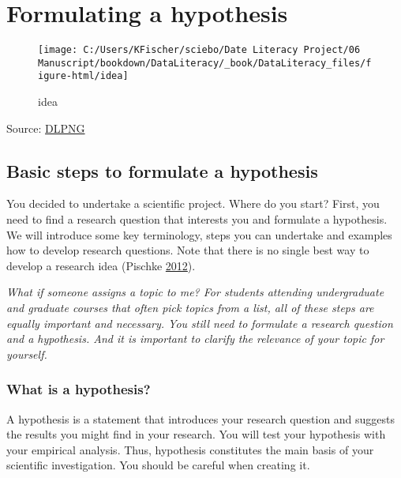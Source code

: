 \documentclass[
]{book}
\begin{document}
\hypertarget{hypothesis}{%
\chapter{Formulating a hypothesis}\label{hypothesis}}

\begin{figure}

{\centering \texttt{[image: C:/Users/KFischer/sciebo/Date Literacy Project/06 Manuscript/bookdown/DataLiteracy/\_book/DataLiteracy\_files/figure-html/idea]} 

}

\caption{idea}\label{fig:unnamed-chunk-3}
\end{figure}

Source: \href{https://dlpng.com/png/6808837}{DLPNG}

\hypertarget{basic-steps-to-formulate-a-hypothesis}{%
\section{Basic steps to formulate a
hypothesis}\label{basic-steps-to-formulate-a-hypothesis}}

You decided to undertake a scientific project. Where do you start?
First, you need to find a research question that interests you and
formulate a hypothesis. We will introduce some key terminology, steps
you can undertake and examples how to develop research questions. Note
that there is no single best way to develop a research idea (Pischke
\protect\hyperlink{ref-pischke_how_2012}{2012}).

\emph{What if someone assigns a topic to me? For students attending
undergraduate and graduate courses that often pick topics from a list,
all of these steps are equally important and necessary. You still need
to formulate a research question and a hypothesis. And it is important
to clarify the relevance of your topic for yourself.}

\hypertarget{what-is-a-hypothesis}{%
\subsection{What is a hypothesis?}\label{what-is-a-hypothesis}}

A hypothesis is a statement that introduces your research question and
suggests the results you might find in your research. You will test your
hypothesis with your empirical analysis. Thus, hypothesis constitutes
the main basis of your scientific investigation. You should be careful
when creating it.
\end{document}
